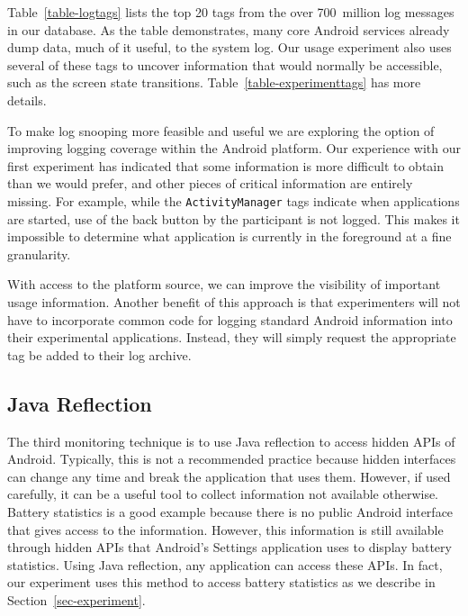 Table~\ref{table-logtags} lists the top 20 tags from the over 700~million log
messages in our database. As the table demonstrates, many core Android
services already dump data, much of it useful, to the system log. Our usage
experiment also uses several of these tags to uncover information that would
normally be accessible, such as the screen state transitions.
Table~\ref{table-experimenttags} has more details.

To make log snooping more feasible and useful we are exploring the option of
improving logging coverage within the Android platform. Our experience with
our first experiment has indicated that some information is more difficult to
obtain than we would prefer, and other pieces of critical information are
entirely missing. For example, while the \texttt{ActivityManager} tags
indicate when applications are started, use of the back button by the
participant is not logged. This makes it impossible to determine what
application is currently in the foreground at a fine granularity.

With access to the platform source, we can improve the visibility of
important usage information. Another benefit of this approach is that
experimenters will not have to incorporate common code for logging standard
Android information into their experimental applications. Instead, they will
simply request the appropriate tag be added to their log archive.

\subsection{Java Reflection}

The third monitoring technique is to use Java reflection to access hidden APIs
of Android. Typically, this is not a recommended practice because hidden interfaces
can change any time and break the application that uses them. However, if used
carefully, it can be a useful tool to collect information not available
otherwise. Battery statistics is a good example because there is no public
Android interface that gives access to the information. However, this information is
still available through hidden APIs that Android's Settings application uses to
display battery statistics. Using Java reflection, any application can access
these APIs. In fact, our experiment uses this method to access battery
statistics as we describe in Section~\ref{sec-experiment}.
